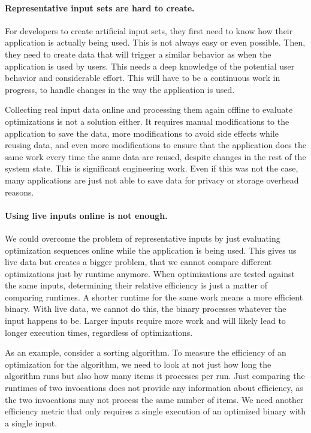     \paragraph{Representative input sets are hard to create.} For developers to create artificial input sets, they first need to know how
    their application is actually being used. This is not always easy or even possible. Then, they need to create data that will trigger a
    similar behavior as when the application is used by users. This needs a deep knowledge of the potential user behavior and
    considerable effort. This will have to be a continuous work in
    progress, to handle changes in the way the application is used.

    Collecting real input data online and processing them again offline to evaluate optimizations is not a solution either. It requires
    manual modifications to the application to save the data, more modifications to avoid side effects while reusing data, and even more
    modifications to ensure that the application does the same work every time the same data are reused, despite changes in the rest of
    the system state. 
    This is significant engineering work. Even if this was not the case, many applications are just not able to save
    data for privacy or storage overhead reasons. 

    \paragraph{Using live inputs online is not enough.} We could overcome the problem of representative inputs by just evaluating
    optimization sequences online while the application is being used. This gives us live data but creates a bigger problem, that we cannot
    compare different optimizations just by runtime anymore. When optimizations are tested against the same inputs, determining their
    relative efficiency is just a matter of comparing runtimes. A shorter runtime for the same work means a more efficient binary.
    With live data, we cannot do this, the binary processes whatever the input happens to be. Larger inputs require more work and will
    likely lead to longer execution times, regardless of optimizations.

    As an example, consider a sorting algorithm. To measure the efficiency of an optimization for the algorithm, we need to look at not just
    how long the algorithm runs but also how many items it processes per run. Just comparing the runtimes of two invocations does not
    provide any information about efficiency, as the two invocations may not process the same number of items. We need another efficiency metric
    that only requires a single execution of an optimized binary with a single input.

